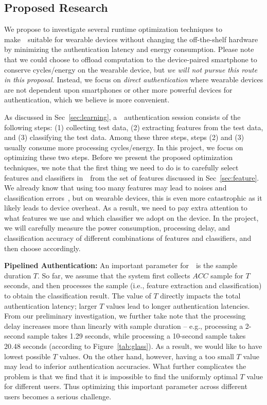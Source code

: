 \subsection{Proposed Research}
We propose to investigate several runtime optimization techniques to make~\systemname~suitable for wearable devices without changing the off-the-shelf hardware by  minimizing the authentication latency and energy consumption. Please note that we could choose to offload computation to the device-paired smartphone to conserve cycles/energy on the wearable device, but \emph{we will not pursue this route in this proposal.} Instead, we focus on \emph{direct authentication} where wearable devices are not dependent upon smartphones or other more powerful devices for authentication, which we believe is more convenient.

As discussed in Sec~\ref{sec:learning}, a~\systemname~authentication session consists of the following steps: (1) collecting test data, (2) extracting features from the test data, and (3) classifying the test data. Among these three steps, steps (2) and (3) usually consume more processing cycles/energy. In this project, we focus on optimizing these two steps. Before we present the proposed optimization techniques, we note that the first thing we need to do is to carefully select features and classifiers in~\systemname~from the set of features discussed in Sec~\ref{sec:feature}. We already know that using too many features may lead to noises and classification errors~\cite{dollar2005behavior}, but on wearable devices, this is even more catastrophic as it likely leads to device overheat. As a result, we need to pay extra attention to what features we use and which classifier we adopt on the device. In the project, we will carefully measure the power consumption, processing delay, and classification accuracy of different combinations of features and classifiers, and then choose accordingly.


\vspace{4pt}\textbf{Pipelined Authentication:} An important parameter for~\systemname~is the sample duration $T$. So far, we assume that the system first collects $ACC$ sample for $T$ seconds, and then processes the sample (i.e., feature extraction and classification) to obtain the classification result. The value of $T$ directly impacts the total authentication latency; larger $T$ values lead to longer authentication latencies.  From our preliminary investigation, we further take note that the processing delay increases more than linearly with sample duration -- e.g., processing a 2-second sample takes 1.29 seconds, while processing a 10-second sample takes 20.48 seconds (according to Figure~\ref{tab:glass}). As a result, we would like to have lowest possible $T$ values. On the other hand, however, having a too small $T$ value may lead to inferior authentication accuracies. What further complicates the problem is that we find that it is impossible to find the uniformly optimal $T$ value for different users. Thus optimizing this important parameter across different users becomes a serious challenge.

